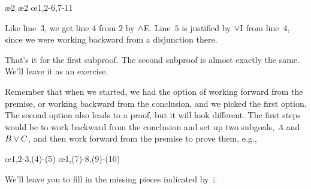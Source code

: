 \begin{fitchproof}
	\PR
	\open
	\AS
	\ae{2}
	\ae{2}
	\close
	\open
	\AS
	\ellipsesline
	\close
	\oe{1,2-6,7-11}
\end{fitchproof}
Like line~$3$, we get line $4$ from $2$ by $\wedge$E. Line~$5$ is justified by $\vee$I from line~$4$, since we were working backward from a disjunction there.

That's it for the first subproof. The second subproof is almost exactly the same. We'll leave it as an exercise.

Remember that when we started, we had the option of working forward from the premise, or working backward from the conclusion, and we picked the first option. The second option also leads to a proof, but it will look different.  The first steps would be to work backward from the conclusion and set up two subgoals, $A$ and $B \vee C$, and then work forward from the premise to prove them, e.g.,
\begin{fitchproof}
	\PR
	\open
	\AS
	\ellipsesline
	\close
	\open
	\AS
	\ellipsesline
	\close
	\oe{1,2-3,(4)-(5)}
	\open
	\AS
	\ellipsesline
	\close
	\open
	\AS
	\ellipsesline
	\close
	\oe{1,(7)-8,(9)-(10)}	
\end{fitchproof}
We'll leave you to fill in the missing pieces indicated by~$\vdots$.


